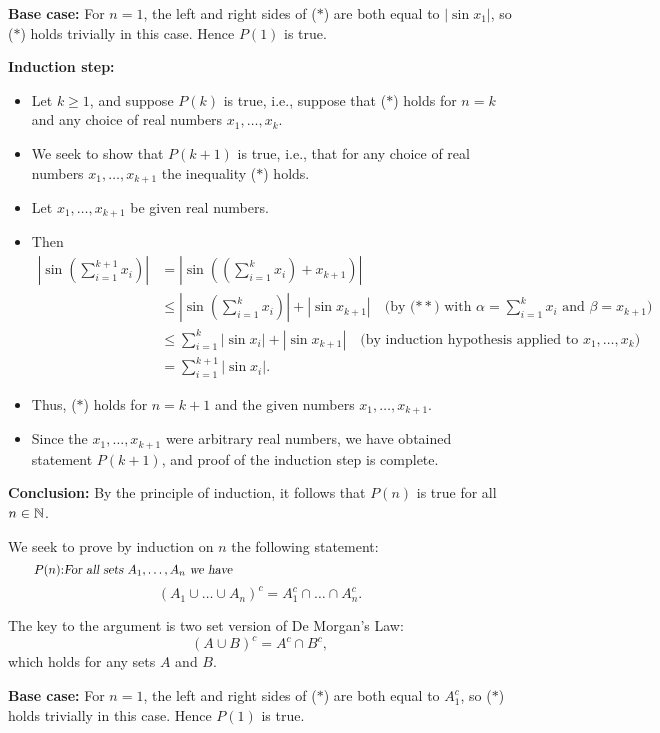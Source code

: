\bigskip


\textbf{Base case:} For $n=1$, the 
left and right sides of ($*$) are both equal to $|\sin x_1|$, so  
($*$) holds trivially in this case. Hence $P(1)$ is true.

\textbf{Induction step:}
\begin{itemize}
\item Let $k\ge 1$, and suppose $P(k)$ is true, i.e.,
suppose that ($*$) holds for $n=k$ and any choice of real numbers 
$x_1,\dots,x_k$.
\item
We seek to show that $P(k+1)$ is true, i.e., that for
any choice of real numbers $x_1,\dots,x_{k+1}$
the inequality ($*$) holds. 
\item
Let $x_1,\dots,x_{k+1}$  be given real numbers. 
\item Then
\begin{align*}
\left|\sin\left(\sum_{i=1}^{k+1} x_i\right)\right|
&=\left|\sin\left(\left(\sum_{i=1}^{k} x_i\right) + x_{k+1}\right)\right|
\\
&\le \left|\sin\left(\sum_{i=1}^{k} x_i\right)\right|
+ \left|\sin x_{k+1}\right|
\quad \text{(by ($**$)
with $\alpha=\sum_{i=1}^k x_i$ and $\beta=x_{k+1}$)}
\\
&\le \sum_{i=1}^k\left|\sin x_i\right|
+ \left|\sin x_{k+1}\right|
\quad \text{(by induction hypothesis applied to $x_1,\dots, x_k$)}
\\
&=\sum_{i=1}^{k+1}\left|\sin x_i\right|.
\end{align*}
\item 
Thus, ($*$) holds for $n=k+1$ and the given numbers $x_1,\dots,x_{k+1}$.
\item
Since the $x_1,\dots,x_{k+1}$ were
arbitrary real numbers, we have obtained statement $P(k+1)$, and 
proof of the induction step is complete.
\end{itemize}

\textbf{Conclusion:} By the principle of induction, 
it follows that $P(n)$ is true for all $n\in\mathbb{N}$.  

We seek to prove by induction on $n$ the following statement: 
\[
\tag*{$P(n)$:}
\parbox{5in}{\slshape For all sets $A_1,\dots,A_n$  
we have}
\]
\[
\left(A_1\cup \dots \cup A_n\right)^c
=A_1^c\cap\dots \cap A_n^c.
\tag{$*$}
\]

The key to the argument is two set version of De Morgan's Law:
\[
(A\cup B)^c = A^c\cap B^c,
\tag{$**$}
\]
which holds for any sets $A$ and $B$.


\textbf{Base case:} For $n=1$, the 
left and right sides of ($*$) are both equal to $A_1^c$,
so ($*$) holds trivially in this case. Hence $P(1)$ is true.
\iffalse
Though not necessary, we can also easily verify the next case,
$n=2$: In this case, the left and right sides of ($*$) are $(A_1\cup A_2)^c$
and $A_1^c\cap A_2^c$, respectively, so the identity is just the two set
version of De Morgan's Law, i.e., ($**$) with $A=A_1$ and $B=A_2$.
\fi


